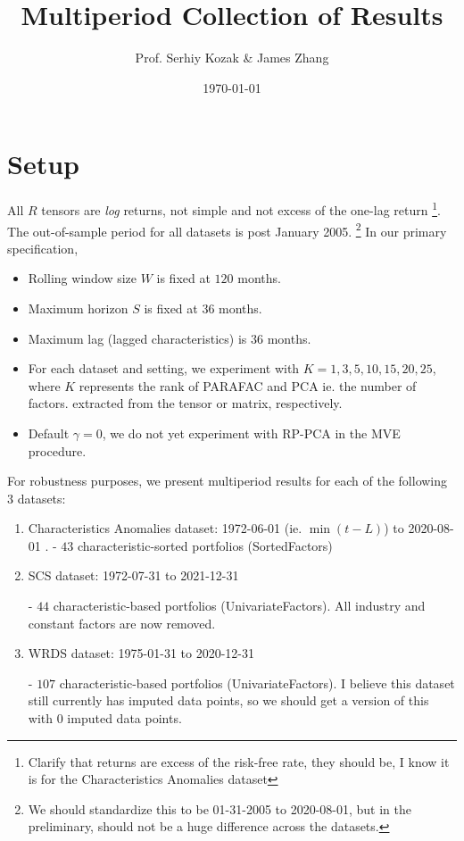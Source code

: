 \documentclass{article}
\title{Multiperiod Collection of Results}
\author{Prof. Serhiy Kozak \& James Zhang}
\date{\today}
\begin{document}
\maketitle

\tableofcontents

\newpage

\section{Setup}

All $R$ tensors are \emph{log} returns, not simple and not excess of the one-lag return \footnote{Clarify that returns are excess of the risk-free rate, they should be, I know it is for the Characteristics Anomalies dataset}. 
The out-of-sample period for all datasets is 
post January 2005. \footnote{We should standardize this to be 01-31-2005 to 2020-08-01, but in the preliminary, should not be a huge difference across 
the datasets.} In our primary specification, 

\begin{itemize}
    \item Rolling window size $W$ is fixed at $120$ months.
    \item Maximum horizon $S$ is fixed at $36$ months.
    \item Maximum lag (lagged characteristics) is $36$ months.
    \item For each dataset and setting, we experiment with $K = 1, 3, 5, 10, 15, 20, 25$, where 
    $K$ represents the rank of PARAFAC and PCA ie. the number of factors.
extracted from the tensor or matrix, respectively. 
    \item Default $\gamma = 0$, we do not yet experiment with RP-PCA in the MVE procedure.
\end{itemize}

For robustness purposes, we present multiperiod results for each of the following $3$ datasets:

\begin{enumerate}
\item Characteristics Anomalies dataset: 1972-06-01 (ie. $\min(t - L)$)  to 2020-08-01
.
- $43$ characteristic-sorted portfolios (SortedFactors)

\item SCS dataset: 1972-07-31 to 2021-12-31

- $44$ characteristic-based portfolios (UnivariateFactors). All industry and constant factors are now removed.

\item WRDS dataset: 1975-01-31 to 2020-12-31

- $107$ characteristic-based portfolios (UnivariateFactors). I believe this dataset still currently has imputed data points, so we should get a version of this with $0$ imputed data points.


\end{enumerate}
\end{document}
